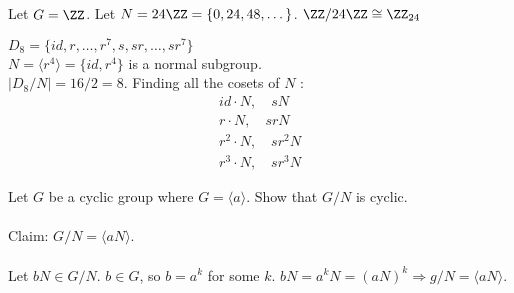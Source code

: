 \documentclass[class=scrartcl, crop=false]{standalone}
\begin{document}
\begin{example}
  Let $G = \ZZ$. Let $N = 24 \ZZ = \{0, 24, 48, \dots\}$. $\ZZ / 24 \ZZ \cong \ZZ_{24}$
\end{example}
\begin{example}
  $D_8 = \{id, r, \dots, r^7, s, s r, \dots, s r^7\}$
  \\
  $N = \langle r^4 \rangle = \{id, r^4\}$ is a normal subgroup.
  \\
  $|D_8 / N| = 16 / 2 = 8$. Finding all the cosets of $N$ :
  \begin{gather*}
    id \cdot N ,\quad sN \\
    r \cdot N ,\quad s rN \\
    r^2 \cdot N ,\quad s r^2N \\
    r^3 \cdot N ,\quad s r^3N
  \end{gather*}

  \begin{exercise}
    Let $G$ be a cyclic group where  $G = \langle a \rangle $. Show that $G / N$ is cyclic.
    \\\\
    Claim: $G / N = \langle aN \rangle $.
    \\\\
    Let $bN \in G / N$. $b \in G$, so $b = a^k$ for some $k$. $bN = a^kN = (aN)^k \Rightarrow g / N = \langle aN \rangle $.
  \end{exercise}

  
\end{example}
\end{document}
